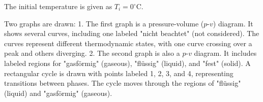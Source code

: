 The initial temperature is given as \( T_i = 0^\circ\text{C} \).  

Two graphs are drawn:  
1. The first graph is a pressure-volume (\( p \)-\( v \)) diagram. It shows several curves, including one labeled "nicht beachtet" (not considered). The curves represent different thermodynamic states, with one curve crossing over a peak and others diverging.  
2. The second graph is also a \( p \)-\( v \) diagram. It includes labeled regions for "gasförmig" (gaseous), "flüssig" (liquid), and "fest" (solid). A rectangular cycle is drawn with points labeled 1, 2, 3, and 4, representing transitions between phases. The cycle moves through the regions of "flüssig" (liquid) and "gasförmig" (gaseous).